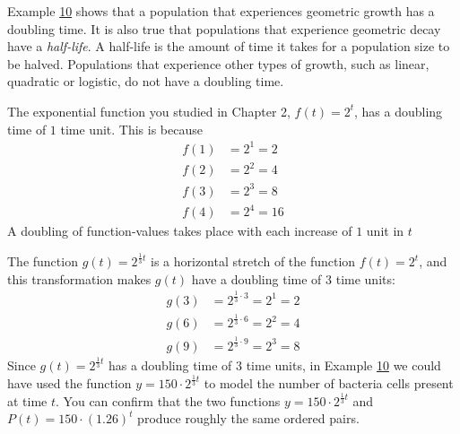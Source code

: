 \documentclass[10pt,]{book}
\theoremstyle{ptxdefinitionnotitle}
\theoremstyle{ptxdefinitiontitle}
\theoremstyle{ptxdefinitionnotitle}
\theoremstyle{ptxdefinitiontitle}
\theoremstyle{ptxdefinitionnotitle}
\theoremstyle{ptxdefinitiontitle}
\numberwithin{equation}{section}
\begin{document}
\hypertarget{p-119}{}%
Example \hyperref[example-doubling-time]{10} shows that a population that experiences geometric growth has a doubling time. It is also true that populations that experience geometric decay have a \emph{half-life}. A half-life is the amount of time it takes for a population size to be halved. Populations that experience other types of growth, such as linear, quadratic or logistic, do not have a doubling time.%
\par
\hypertarget{p-120}{}%
The exponential function you studied in Chapter 2, \(f(t)=2^t\), has a doubling time of \(1\) time unit. This is because%
%
\begin{align*}
f(1)&=2^1=2\\
f(2)&=2^2=4\\
f(3)&=2^3=8\\
f(4)&=2^4=16
\end{align*}
\hypertarget{p-121}{}%
A doubling of function-values takes place with each increase of \(1\) unit in \(t\)%
\par
\hypertarget{p-122}{}%
The function \(g(t)=2^{\frac{1}{3} t}\) is a horizontal stretch of the function \(f(t)=2^t\), and this transformation makes \(g(t)\) have a doubling time of \(3\) time units:%
%
\begin{align*}
g(3)&=2^{\frac{1}{3} \cdot 3}=2^1=2\\
g(6)&=2^{\frac{1}{3} \cdot 6}=2^2=4\\
g(9)&=2^{\frac{1}{3} \cdot 9}=2^3=8
\end{align*}
\hypertarget{p-123}{}%
Since \(g(t)=2^{\frac{1}{3} t}\) has a doubling time of \(3\) time units, in Example \hyperref[example-doubling-time]{10} we could have used the function \(y = 150 \cdot 2^{\frac{1}{3} t}\) to model the number of bacteria cells present at time \(t\). You can confirm that the two functions \(y = 150 \cdot 2^{\frac{1}{3} t}\) and \(P(t)=150 \cdot (1.26)^t\) produce roughly the same ordered pairs.%
\typeout{************************************************}
\typeout{************************************************}
\end{document}
